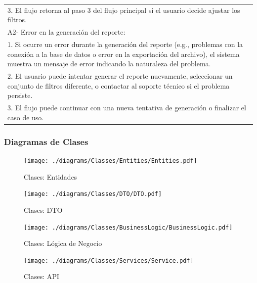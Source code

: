 \documentclass[stu, 12pt, letterpaper, donotrepeattitle, floatsintext, natbib]{apa7}
\begin{document}
\begin{longtable}{@{} p{16.5cm} @{}}
    \hspace{1cm}3. El flujo retorna al paso 3 del flujo principal si el usuario decide ajustar los filtros.                                                                                                                                                                    \\
    A2- Error en la generación del reporte:                                                                                                                                                                                                                                    \\
    \hspace{1cm}1. Si ocurre un error durante la generación del reporte (e.g., problemas con la conexión a la base de datos o error en la exportación del archivo), el sistema muestra un mensaje de error indicando la naturaleza del problema.                               \\
    \hspace{1cm}2. El usuario puede intentar generar el reporte nuevamente, seleccionar un conjunto de filtros diferente, o contactar al soporte técnico si el problema persiste.                                                                                              \\
    \hspace{1cm}3. El flujo puede continuar con una nueva tentativa de generación o finalizar el caso de uso.                                                                                                                                                                  \\ \bottomrule
\end{longtable}
\newpage
\subsubsection{Diagramas de Clases}
\begin{figure}[H]
    \centering
    \caption{Clases: Entidades}
    \texttt{[image: ./diagrams/Classes/Entities/Entities.pdf]}
\end{figure}
\begin{figure}[H]
    \centering
    \caption{Clases: DTO}
    \texttt{[image: ./diagrams/Classes/DTO/DTO.pdf]}
\end{figure}
\begin{figure}[H]
    \centering
    \caption{Clases: Lógica de Negocio}
    \texttt{[image: ./diagrams/Classes/BusinessLogic/BusinessLogic.pdf]}
\end{figure}
\begin{figure}[H]
    \centering
    \caption{Clases: API}
    \texttt{[image: ./diagrams/Classes/Services/Service.pdf]}
\end{figure}
\end{document}
